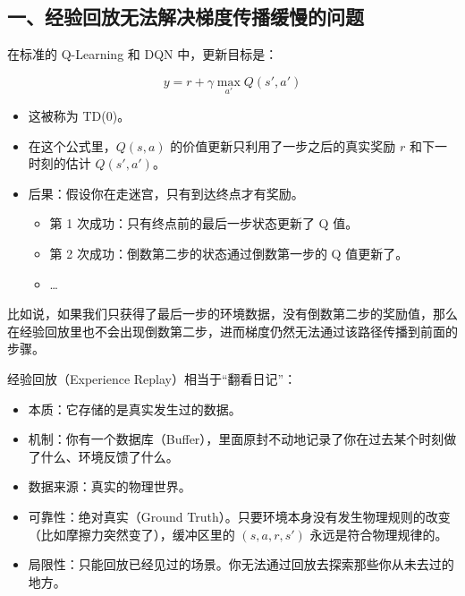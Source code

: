 \hypertarget{ux4e00ux7ecfux9a8cux56deux653eux65e0ux6cd5ux89e3ux51b3ux68afux5ea6ux4f20ux64adux7f13ux6162ux7684ux95eeux9898}{%
\subsection{一、经验回放无法解决梯度传播缓慢的问题}\label{ux4e00ux7ecfux9a8cux56deux653eux65e0ux6cd5ux89e3ux51b3ux68afux5ea6ux4f20ux64adux7f13ux6162ux7684ux95eeux9898}}

在标准的 Q-Learning 和 DQN 中，更新目标是：

\[
y=r+\gamma \max_{a'}Q(s',a')
\]

\begin{itemize}
\tightlist
\item
  这被称为 TD(0)。
\item
  在这个公式里，\(Q(s,a)\) 的价值更新只利用了一步之后的真实奖励 \(r\) 和下一时刻的估计 \(Q(s',a')\)。
\item
  后果：假设你在走迷宫，只有到达终点才有奖励。

  \begin{itemize}
  \tightlist
  \item
    第 1 次成功：只有终点前的最后一步状态更新了 Q 值。
  \item
    第 2 次成功：倒数第二步的状态通过倒数第一步的 Q 值更新了。
  \item
    \ldots{}
  \end{itemize}
\end{itemize}

比如说，如果我们只获得了最后一步的环境数据，没有倒数第二步的奖励值，那么在经验回放里也不会出现倒数第二步，进而梯度仍然无法通过该路径传播到前面的步骤。

经验回放（Experience Replay）相当于``翻看日记''：

\begin{itemize}
\tightlist
\item
  本质：它存储的是真实发生过的数据。
\item
  机制：你有一个数据库（Buffer），里面原封不动地记录了你在过去某个时刻做了什么、环境反馈了什么。
\item
  数据来源：真实的物理世界。
\item
  可靠性：绝对真实（Ground Truth）。只要环境本身没有发生物理规则的改变（比如摩擦力突然变了），缓冲区里的 \((s,a,r,s')\) 永远是符合物理规律的。
\item
  局限性：只能回放已经见过的场景。你无法通过回放去探索那些你从未去过的地方。
\end{itemize}

